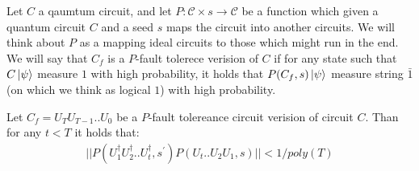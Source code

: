 \documentclass[manuscript,screen,review]{acmart}
\begin{document}
\newpage
\begin{definition}
  Let $C$ a qaumtum circuit, and let $P : \mathcal{C} \times s  \rightarrow \mathcal{C}$ be a function which given a quantum circuit $C$ and a seed $s$ maps the circuit into another circuits. We will think about $P$ as a mapping ideal circuits to those which might run in the end. We will say that $C_{f}$ is a $P$-fault tolerece verision of $C$ if for any state such that $C\ket{\psi}$ measure $1$ with high probability, it holds that $P(C_{f},s)\ket{\psi}$ measure string $\bar{1}$ (on which we think as logical $1$) with high probability.  
\end{definition}

\begin{claim}
  Let $C_{f} = U_{T}U_{T-1}..U_{0}$ be a $P$-fault tolereance circuit verision of circuit $C$. Than for any $t < T$ it holds that:    
  \begin{equation*}
    \begin{split}
      || P\left(U_{1}^{\dagger} U_{2}^{\dagger}.. U_{t}^{\dagger} ,s^{\prime} \right) P\left(U_{t}.. U_{2} U_{1}, s\right)  || < 1/poly(T)
    \end{split}
  \end{equation*}
\end{claim}




\printbibliography
\end{document}
